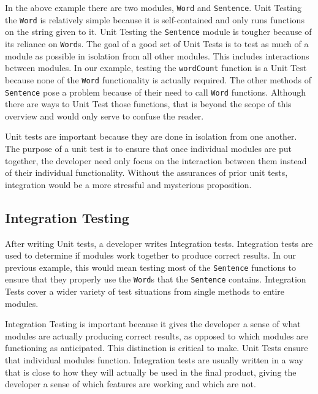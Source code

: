 \documentclass[12pt]{ucthesis}
\begin{document}
In the above example there are two modules, \lstinline{Word} and \lstinline{Sentence}. Unit Testing the \lstinline{Word} is relatively simple because it is self-contained and only runs functions on the string given to it. Unit Testing the \lstinline{Sentence} module is tougher because of its reliance on \lstinline{Word}s. The goal of a good set of Unit Tests is to test as much of a module as possible in isolation from all other modules. This includes interactions between modules. In our example, testing the \lstinline{wordCount} function is a Unit Test because none of the \lstinline{Word} functionality is actually required. The other methods of \lstinline{Sentence} pose a problem because of their need to call \lstinline{Word} functions. Although there are ways to Unit Test those functions, that is beyond the scope of this overview and would only serve to confuse the reader.

Unit tests are important because they are done in isolation from one another. The purpose of a unit test is to ensure that once individual modules are put together, the developer need only focus on the interaction between them instead of their individual functionality. Without the assurances of prior unit tests, integration would be a more stressful and mysterious proposition.

\subsection{Integration Testing}
After writing Unit tests, a developer writes Integration tests. Integration tests are used to determine if modules work together to produce correct results. In our previous example, this would mean testing most of the \lstinline{Sentence} functions to ensure that they properly use the \lstinline{Word}s that the \lstinline{Sentence} contains. Integration Tests cover a wider variety of test situations from single methods to entire modules.

Integration Testing is important because it gives the developer a sense of what modules are actually producing correct results, as opposed to which modules are functioning as anticipated. This distinction is critical to make. Unit Tests ensure that individual modules function. Integration tests are usually written in a way that is close to how they will actually be used in the final product, giving the developer a sense of which features are working and which are not.
\end{document}
